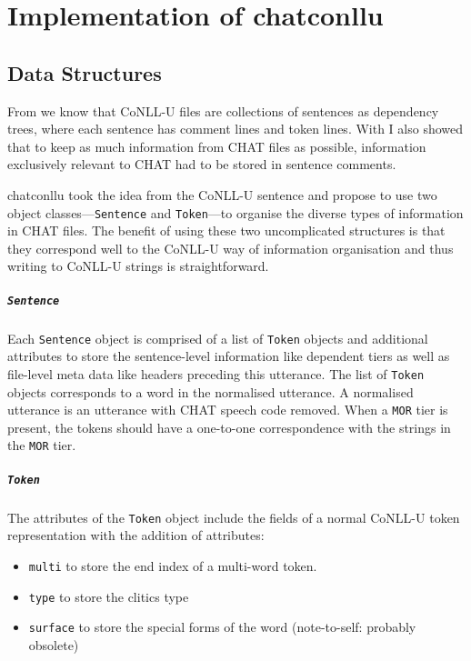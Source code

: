 \chapter{Implementation of chatconllu} %

\label{Chapter3} %

\section{Data Structures}
From  we know that CoNLL-U files are collections of sentences as dependency trees, where each sentence has comment lines and token lines. With  I also showed that to keep as much information from CHAT files as possible, information exclusively relevant to CHAT had to be stored in sentence comments.

chatconllu took the idea from the CoNLL-U sentence and propose to use two object classes---\texttt{Sentence} and \texttt{Token}---to organise the diverse types of information in CHAT files. The benefit of using these two uncomplicated structures is that they correspond well to the CoNLL-U way of information organisation and thus writing to CoNLL-U strings is straightforward.

\paragraph{\texttt{Sentence}}

Each \texttt{Sentence} object is comprised of a list of \texttt{Token} objects and additional attributes to store the sentence-level information like dependent tiers as well as file-level meta data like headers preceding this utterance. The list of \texttt{Token} objects corresponds to a word in the normalised utterance. A normalised utterance is an utterance with CHAT speech code removed. When a \texttt{MOR} tier is present, the tokens should have a one-to-one correspondence with the strings in the \texttt{MOR} tier.

\paragraph{\texttt{Token}}

The attributes of the \texttt{Token} object include the  fields of a normal CoNLL-U token representation with the addition of  attributes:
\begin{itemize}
	\item \texttt{multi} to store the end index of a multi-word token.
	\item \texttt{type} to store the clitics type
	\item \texttt{surface} to store the special forms of the word (note-to-self: probably obsolete)
\end{itemize}

